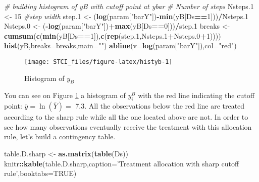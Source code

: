 \documentclass[]{book}
\newenvironment{Shaded}{\begin{snugshade}}{\end{snugshade}}
\newcommand{\CommentTok}[1]{\textcolor[rgb]{0.56,0.35,0.01}{\textit{#1}}}
\newcommand{\DataTypeTok}[1]{\textcolor[rgb]{0.13,0.29,0.53}{#1}}
\newcommand{\DecValTok}[1]{\textcolor[rgb]{0.00,0.00,0.81}{#1}}
\newcommand{\FloatTok}[1]{\textcolor[rgb]{0.00,0.00,0.81}{#1}}
\newcommand{\KeywordTok}[1]{\textcolor[rgb]{0.13,0.29,0.53}{\textbf{#1}}}
\newcommand{\NormalTok}[1]{#1}
\newcommand{\OperatorTok}[1]{\textcolor[rgb]{0.81,0.36,0.00}{\textbf{#1}}}
\newcommand{\OtherTok}[1]{\textcolor[rgb]{0.56,0.35,0.01}{#1}}
\newcommand{\StringTok}[1]{\textcolor[rgb]{0.31,0.60,0.02}{#1}}
\theoremstyle{definition}
\theoremstyle{definition}
\theoremstyle{definition}
\theoremstyle{remark}
\begin{document}
\begin{Shaded}
\begin{Highlighting}[]
\CommentTok{# building histogram of yB with cutoff point at ybar}
\CommentTok{# Number of steps}
\NormalTok{Nsteps}\FloatTok{.1}\NormalTok{ <-}\StringTok{ }\DecValTok{15}
\CommentTok{#step width}
\NormalTok{step}\FloatTok{.1}\NormalTok{ <-}\StringTok{ }\NormalTok{(}\KeywordTok{log}\NormalTok{(param[}\StringTok{"barY"}\NormalTok{])}\OperatorTok{-}\KeywordTok{min}\NormalTok{(yB[Ds}\OperatorTok{==}\DecValTok{1}\NormalTok{]))}\OperatorTok{/}\NormalTok{Nsteps}\FloatTok{.1}
\NormalTok{Nsteps}\FloatTok{.0}\NormalTok{ <-}\StringTok{ }\NormalTok{(}\OperatorTok{-}\KeywordTok{log}\NormalTok{(param[}\StringTok{"barY"}\NormalTok{])}\OperatorTok{+}\KeywordTok{max}\NormalTok{(yB[Ds}\OperatorTok{==}\DecValTok{0}\NormalTok{]))}\OperatorTok{/}\NormalTok{step}\FloatTok{.1}
\NormalTok{breaks <-}\StringTok{ }\KeywordTok{cumsum}\NormalTok{(}\KeywordTok{c}\NormalTok{(}\KeywordTok{min}\NormalTok{(yB[Ds}\OperatorTok{==}\DecValTok{1}\NormalTok{]),}\KeywordTok{c}\NormalTok{(}\KeywordTok{rep}\NormalTok{(step}\FloatTok{.1}\NormalTok{,Nsteps}\FloatTok{.1}\OperatorTok{+}\NormalTok{Nsteps}\FloatTok{.0}\OperatorTok{+}\DecValTok{1}\NormalTok{))))}
\KeywordTok{hist}\NormalTok{(yB,}\DataTypeTok{breaks=}\NormalTok{breaks,}\DataTypeTok{main=}\StringTok{""}\NormalTok{)}
\KeywordTok{abline}\NormalTok{(}\DataTypeTok{v=}\KeywordTok{log}\NormalTok{(param[}\StringTok{"barY"}\NormalTok{]),}\DataTypeTok{col=}\StringTok{"red"}\NormalTok{)}
\end{Highlighting}
\end{Shaded}

\begin{figure}

{\centering \texttt{[image: STCI\_files/figure-latex/histyb-1]} 

}

\caption{Histogram of $y_B$}\label{fig:histyb}
\end{figure}

You can see on Figure \ref{fig:histyb} a histogram of \(y_i^B\) with the red line indicating the cutoff point: \(\bar{y}=\ln(\bar{Y})=\) 7.3.
All the observations below the red line are treated according to the sharp rule while all the one located above are not.
In order to see how many observations eventually receive the treatment with this allocation rule, let's build a contingency table.

\begin{Shaded}
\begin{Highlighting}[]
\NormalTok{table.D.sharp <-}\StringTok{ }\KeywordTok{as.matrix}\NormalTok{(}\KeywordTok{table}\NormalTok{(Ds))}
\NormalTok{knitr}\OperatorTok{::}\KeywordTok{kable}\NormalTok{(table.D.sharp,}\DataTypeTok{caption=}\StringTok{'Treatment allocation with sharp cutoff rule'}\NormalTok{,}\DataTypeTok{booktabs=}\OtherTok{TRUE}\NormalTok{)}
\end{Highlighting}
\end{Shaded}
\end{document}
